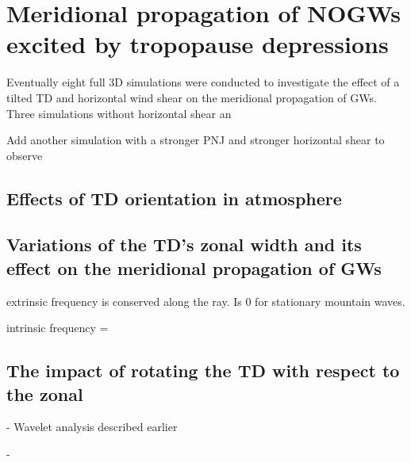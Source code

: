 \chapter{Meridional propagation of NOGWs excited by tropopause depressions}
\label{sec:results3D}

Eventually eight full 3D simulations were conducted to investigate the effect of a tilted TD and horizontal wind shear on the meridional propagation of GWs.
Three simulations without horizontal shear an


Add another simulation with a stronger PNJ and stronger horizontal shear to observe 
\section{Effects of TD orientation in atmosphere}


\section{Variations of the TD's zonal width and its effect on the meridional propagation of GWs}

extrinsic frequency is conserved along the ray. Is 0 for stationary mountain waves.

intrinsic frequency = 




\section{The impact of rotating the TD with respect to the zonal}

- Wavelet analysis described earlier

- \cite[]{}

